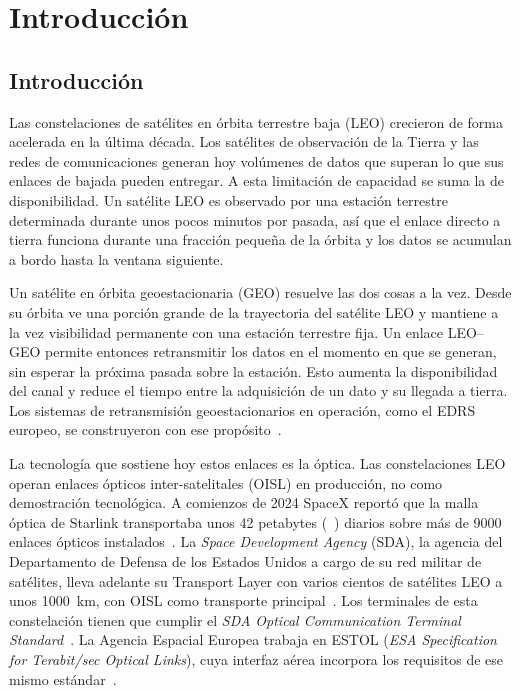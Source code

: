 \chapter{Introducci\'on}
\label{cap:introduccion}

\section{Introducci\'on}
\label{sec:intro-intro}

Las constelaciones de sat\'elites en \'orbita terrestre baja (LEO) crecieron de
forma acelerada en la \'ultima d\'ecada. Los sat\'elites de observaci\'on de la
Tierra y las redes de comunicaciones generan hoy vol\'umenes de datos que
superan lo que sus enlaces de bajada pueden entregar. A esta limitaci\'on de
capacidad se suma la de disponibilidad. Un sat\'elite LEO es observado por una estaci\'on
terrestre determinada durante unos pocos minutos por pasada, as\'i que el
enlace directo a tierra funciona durante una fracci\'on peque\~na de la
\'orbita y los datos se acumulan a bordo hasta la ventana siguiente.

Un sat\'elite en \'orbita geoestacionaria (GEO) resuelve las dos cosas a la
vez. Desde su \'orbita ve una porci\'on grande de la trayectoria del sat\'elite
LEO y mantiene a la vez visibilidad permanente con una estaci\'on terrestre
fija. Un enlace LEO--GEO permite entonces retransmitir los datos en el momento
en que se generan, sin esperar la pr\'oxima pasada sobre la estaci\'on. Esto
aumenta la disponibilidad del canal y reduce el tiempo entre la adquisici\'on
de un dato y su llegada a tierra. Los sistemas de retransmisi\'on
geoestacionarios en operaci\'on, como el EDRS europeo, se construyeron con ese
prop\'osito~\cite{esa_edrs}.

La tecnolog\'ia que sostiene hoy estos enlaces es la \'optica. Las
constelaciones LEO operan enlaces \'opticos inter-satelitales (OISL) en
producci\'on, no como demostraci\'on tecnol\'ogica. A comienzos de 2024 SpaceX
report\'o que la malla \'optica de Starlink transportaba unos \num{42}
petabytes (\si{\peta\byte}) diarios sobre m\'as de \num{9000} enlaces
\'opticos instalados~\cite{starlink2024}. La \emph{Space Development Agency}
(SDA), la agencia del Departamento de Defensa de los Estados Unidos a cargo de
su red militar de sat\'elites, lleva adelante su Transport Layer con varios
cientos de sat\'elites LEO a unos \SI{1000}{\kilo\metre}, con OISL como
transporte principal~\cite{sda_transport}. Los terminales de esta
constelaci\'on tienen que cumplir el \emph{SDA Optical Communication Terminal
Standard}~\cite{sda_oct}. La Agencia Espacial Europea trabaja en ESTOL
(\emph{ESA Specification for Terabit/sec Optical Links}), cuya interfaz
a\'erea incorpora los requisitos de ese mismo est\'andar~\cite{esa_estol}.

